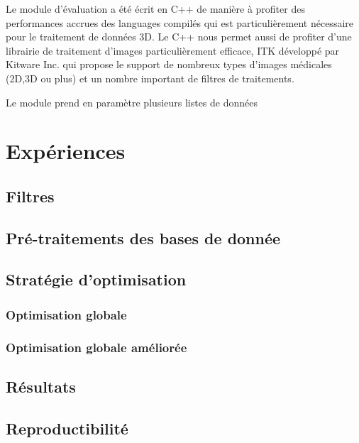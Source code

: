 
Le module d'évaluation a été écrit en C++ de manière à profiter des performances accrues des languages compilés qui est particulièrement nécessaire pour le traitement de données 3D. Le C++ nous permet aussi de profiter d'une librairie de traitement d'images particulièrement efficace, ITK développé par Kitware Inc. qui propose le support de nombreux types d'images médicales (2D,3D ou plus) et un nombre important de filtres de traitements.

Le module prend en paramètre plusieurs listes de données 

\section{Expériences}
\label{sec:Benchmark:experiences}

\subsection{Filtres}
\label{sec:Filtres}

\subsection{Pré-traitements des bases de donnée}
\label{sec:Benchmark:traitement_des_données}

\subsection{Stratégie d'optimisation}
\label{sec:Benchmark:optimisation}

\subsubsection{Optimisation globale}
\label{sec:Benchmark:optimisation_globale}

\subsubsection{Optimisation globale améliorée}
\label{sec:Benchmark:optimisation_globale_ameliorée}

\subsection{Résultats}
\label{sec:Benchmark:résultats}

\subsection{Reproductibilité}
\label{sec:Benchmark:reproductibilité}